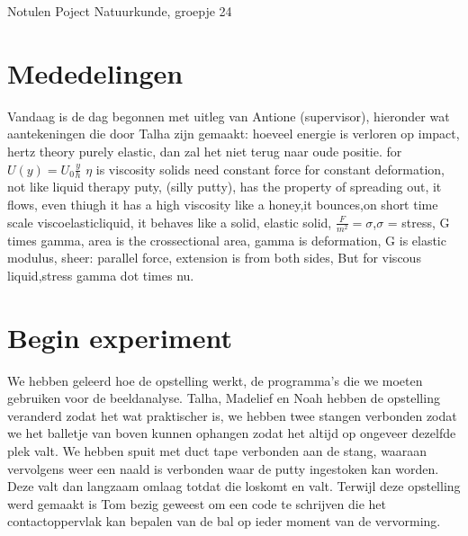 \documentclass[11pt,a4paper]{article}
\begin{document}
\begin{Minutes}{Notulen Poject Natuurkunde, groepje 24}


\endtime{}




\maketitle



\newpage



\section{Mededelingen} 
Vandaag is de dag begonnen met uitleg van Antione (supervisor), hieronder wat aantekeningen die door Talha zijn gemaakt:
hoeveel energie is verloren op impact, hertz theory purely elastic, dan zal het niet terug naar oude positie.
for $U(y)=U_0 \frac{y}{h}$ 
$\eta$ is viscosity 
solids need constant force for constant deformation, not like liquid therapy puty, (silly putty), has the property of spreading out, it flows, even thiugh it has a high viscosity like a honey,it bounces,on short time scale viscoelasticliquid, it behaves like a solid, 
elastic solid, $\frac{F}{m^2}=\sigma$,$\sigma$ = stress, G times gamma, area is the crossectional area, gamma is deformation, G is elastic modulus, sheer: parallel force, extension is from both sides, But for viscous liquid,stress gamma dot times nu. 

\section{Begin experiment}
We hebben geleerd hoe de opstelling werkt, de programma's die we moeten gebruiken voor de beeldanalyse. 
Talha, Madelief en Noah hebben de opstelling veranderd zodat het wat praktischer is, we hebben twee stangen verbonden zodat we het balletje van boven kunnen ophangen zodat het altijd op ongeveer dezelfde plek valt. We hebben spuit met duct tape verbonden aan de stang, waaraan vervolgens weer een naald is verbonden waar de putty ingestoken kan worden. Deze valt dan langzaam omlaag totdat die loskomt en valt.
Terwijl deze opstelling werd gemaakt is Tom bezig geweest om een code te schrijven die het contactoppervlak kan bepalen van de bal op ieder moment van de vervorming.


\end{Minutes}
\end{document}

